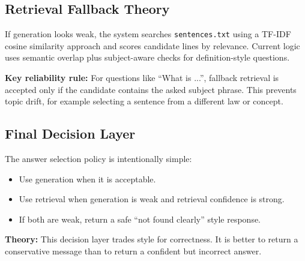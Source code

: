 \documentclass[a4paper,11pt]{article}
\begin{document}
\subsection{Retrieval Fallback Theory}
If generation looks weak, the system searches \texttt{sentences.txt} using a TF-IDF cosine similarity approach and scores candidate lines by relevance.
Current logic uses semantic overlap plus subject-aware checks for definition-style questions.

\textbf{Key reliability rule:}
For questions like ``What is ...'', fallback retrieval is accepted only if the candidate contains the asked subject phrase.
This prevents topic drift, for example selecting a sentence from a different law or concept.

\subsection{Final Decision Layer}
The answer selection policy is intentionally simple:
\begin{itemize}[leftmargin=1.5em]
    \item Use generation when it is acceptable.
    \item Use retrieval when generation is weak and retrieval confidence is strong.
    \item If both are weak, return a safe ``not found clearly'' style response.
\end{itemize}

\textbf{Theory:}
This decision layer trades style for correctness.
It is better to return a conservative message than to return a confident but incorrect answer.
\end{document}
